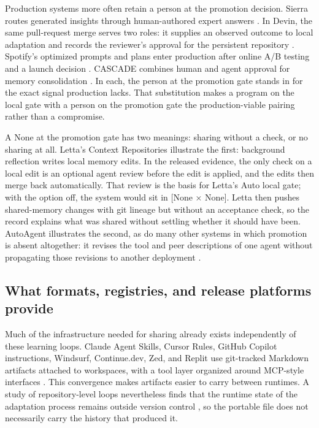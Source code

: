 \documentclass[
  11pt,
]{article}
\begin{document}
Production systems more often retain a person at the promotion decision. Sierra routes generated insights through human-authored expert answers \cite{sierra2025os20}. In Devin, the same pull-request merge serves two roles: it supplies an observed outcome to local adaptation and records the reviewer's approval for the persistent repository \cite{cognition2025devinreview}. Spotify's optimized prompts and plans enter production after online A/B testing and a launch decision \cite{palumbo2026spotify}. CASCADE combines human and agent approval for memory consolidation \cite{huang2025cascade}. In each, the person at the promotion gate stands in for the exact signal production lacks. That substitution makes a program on the local gate with a person on the promotion gate the production-viable pairing rather than a compromise.

A None at the promotion gate has two meanings: sharing without a check, or no sharing at all. Letta's Context Repositories illustrate the first: background reflection writes local memory edits. In the released evidence, the only check on a local edit is an optional agent review before the edit is applied, and the edits then merge back automatically. That review is the basis for Letta's Auto local gate; with the option off, the system would sit in {[}None × None{]}. Letta then pushes shared-memory changes with git lineage but without an acceptance check, so the record explains what was shared without settling whether it should have been. AutoAgent illustrates the second, as do many other systems in which promotion is absent altogether: it revises the tool and peer descriptions of one agent without propagating those revisions to another deployment \cite{wang2026autoagent}.

\subsection{What formats, registries, and release platforms provide}\label{what-formats-registries-and-release-platforms-provide}

Much of the infrastructure needed for sharing already exists independently of these learning loops. Claude Agent Skills, Cursor Rules, GitHub Copilot instructions, Windsurf, Continue.dev, Zed, and Replit use git-tracked Markdown artifacts attached to workspaces, with a tool layer organized around MCP-style interfaces \cite{galster2026harnessconfig, barbaste2026harnessengineering}. This convergence makes artifacts easier to carry between runtimes. A study of repository-level loops nevertheless finds that the runtime state of the adaptation process remains outside version control \cite{lulla2026loopengineering}, so the portable file does not necessarily carry the history that produced it.
\end{document}
